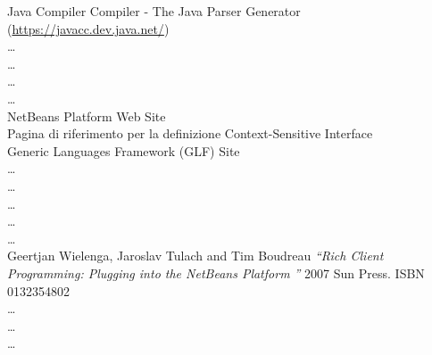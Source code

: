 \begin{thebibliography}{99}
 Java Compiler Compiler - The Java Parser
Generator (\href{https://javacc.dev.java.net/}{https://javacc.dev.java.net/})
\\

 \ldots
\\

 \ldots
\\

 \ldots
\\


 \ldots
\\

 NetBeans Platform Web Site
\\

 Pagina di riferimento per la definizione
Context-Sensitive Interface
\\

 Generic Languages Framework (GLF) Site	
\\

 \ldots
\\

 \ldots
\\

 \ldots
\\

 \ldots
\\

 \ldots
\\


 Geertjan Wielenga, Jaroslav Tulach and Tim Boudreau
\emph{``Rich Client Programming: Plugging into the NetBeans Platform ''} 2007
Sun Press. ISBN 0132354802
\\

 \ldots
\\

 \ldots
\\

 \ldots
\\

\end{thebibliography} 
